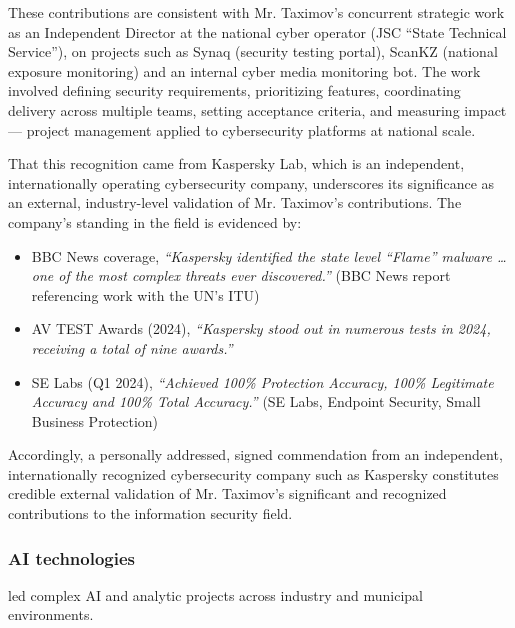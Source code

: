 These contributions are consistent with Mr. Taximov's concurrent strategic work as an Independent Director at the national cyber operator (JSC ``State Technical Service''), on projects such as Synaq (security testing portal), ScanKZ (national exposure monitoring) and an internal cyber media monitoring bot. The work involved defining security requirements, prioritizing features, coordinating delivery across multiple teams, setting acceptance criteria, and measuring impact --- project management applied to cybersecurity platforms at national scale.


That this recognition came from Kaspersky Lab, which is an independent, internationally operating cybersecurity company, underscores its significance as an external, industry-level validation of Mr. Taximov's contributions. The company's standing in the field is evidenced by:


\vspace{-0.5\baselineskip}
\begin{itemize}[nosep]
\item BBC News coverage, \emph{``Kaspersky identified the state level ``Flame'' malware … one of the most complex threats ever discovered.''} (BBC News report referencing work with the UN's ITU)
\item AV TEST Awards (2024), \emph{``Kaspersky stood out in numerous tests in 2024, receiving a total of nine awards.''}
\item SE Labs (Q1 2024), \emph{``Achieved 100\% Protection Accuracy, 100\% Legitimate Accuracy and 100\% Total Accuracy.''} (SE Labs, Endpoint Security, Small Business Protection)
\end{itemize}




Accordingly, a personally addressed, signed commendation from an independent, internationally recognized cybersecurity company such as Kaspersky constitutes credible external validation of Mr. Taximov's significant and recognized contributions to the information security field.


\subsubsection{AI technologies}

\label{subsubsecContribAI}

\mrl{} led complex AI and analytic projects across industry and municipal environments.

